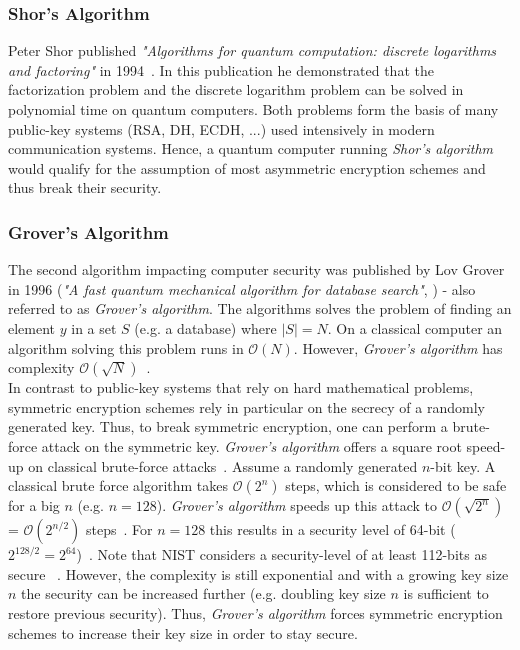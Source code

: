 \subsubsection{Shor's Algorithm}
Peter Shor published \textit{"Algorithms for quantum computation: discrete logarithms and factoring"} in 1994~\parencite{shor1994algorithms}. In this publication he demonstrated that the factorization problem and the discrete logarithm problem can be solved in polynomial time on quantum computers. Both problems form the basis of many public-key systems (\gls{RSA}, \gls{DH}, \gls{ECDH}, ...) used intensively in modern communication systems. Hence, a quantum computer running \textit{Shor's algorithm} would qualify for the assumption of most asymmetric encryption schemes and thus break their security.


\subsubsection{Grover's Algorithm}
The second algorithm impacting computer security was published by Lov Grover in 1996 (\textit{"A fast quantum mechanical algorithm for database search"}, \parencite{grover1996fast}) - also referred to as \textit{Grover's algorithm}. The algorithms solves the problem of finding an element $y$ in a set $S$ (e.g. a database) where $|S| = N$. On a classical computer an algorithm solving this problem runs in $\mathcal{O}(N)$. However, \textit{Grover's algorithm} has complexity $\mathcal{O}(\sqrt{N})$~\parencite{nielsen2002quantum}.\\
In contrast to public-key systems that rely on hard mathematical problems, symmetric encryption schemes rely in particular on the secrecy of a randomly generated key. 
Thus, to break symmetric encryption, one can perform a brute-force attack on the symmetric key. \textit{Grover's algorithm} offers a square root speed-up on classical brute-force attacks~\parencite{mavroeidis2018impact}. Assume a randomly generated $n$-bit key. A classical brute force algorithm takes $\mathcal{O}(2^n)$ steps, which is considered to be safe for a big $n$ (e.g. $n=128$). \textit{Grover's algorithm} speeds up this attack to $\mathcal{O}(\sqrt{2^n})$ = $\mathcal{O}(2^{n/2})$ steps~\parencite{mavroeidis2018impact}. For $n=128$ this results in a security level of 64-bit ($2^{128/2}=2^{64}$)~\parencite{mavroeidis2018impact}. Note that \gls{NIST} considers a security-level of at least 112-bits as secure ~\parencite{barker2019transitioning}.  However, the complexity is still exponential and with a growing key size $n$ the security can be increased further (e.g. doubling key size $n$ is sufficient to restore previous security). Thus, \textit{Grover's algorithm} forces symmetric encryption schemes to increase their key size in order to stay secure.
